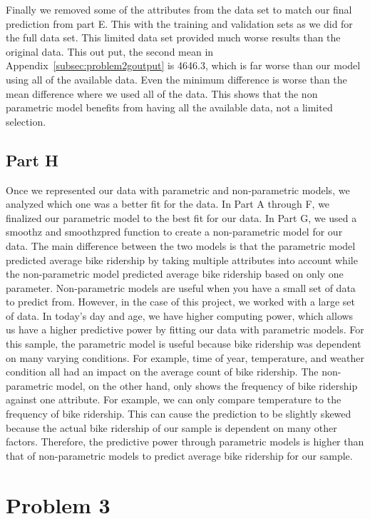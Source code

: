 \documentclass[11pt]{article}
\begin{document}
Finally we removed some of the attributes from the data set to match our final prediction from part E. This with the training and validation sets as we did for the full data set. This limited data set provided much worse results than the original data. This out put, the second mean in Appendix~\ref{subsec:problem2goutput} is 4646.3, which is far worse than our model using all of the available data. Even the minimum difference is worse than the mean difference where we used all of the data. This shows that the non parametric model benefits from having all the available data, not a limited selection.

\subsection{Part H}
\label{subsec:2h}
Once we represented our data with parametric and non-parametric models, we analyzed which one was a better fit for the data. In Part A through F, we finalized our parametric model to the best fit for our data. In Part G, we used a smoothz and smoothzpred function to create a non-parametric model for our data. The main difference between the two models is that the parametric model predicted average bike ridership by taking multiple attributes into account while the non-parametric model predicted average bike ridership based on only one parameter. Non-parametric models are useful when you have a small set of data to predict from. However, in the case of this project, we worked with a large set of data. In today's day and age, we have higher computing power, which allows us have a higher predictive power by fitting our data with parametric models. For this sample, the parametric model is useful because bike ridership was dependent on many varying conditions. For example, time of year, temperature, and weather condition all had an impact on the average count of bike ridership. The non-parametric model, on the other hand, only shows the frequency of bike ridership against one attribute. For example, we can only compare  temperature to the frequency of bike ridership. This can cause the prediction to be slightly skewed because the actual bike ridership of our sample is dependent on many other factors. Therefore, the predictive power through parametric models is higher than that of non-parametric models to predict average bike ridership for our sample.

\pagebreak

\section{Problem 3}
\label{sec:problem3}
\end{document}
